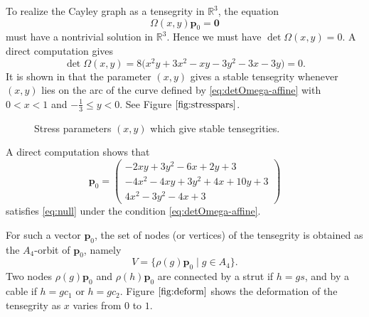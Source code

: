 \documentclass[12pt]{article}
\begin{document}
To realize the Cayley graph as a tensegrity in $\mathbb{R}^3$,
the equation
\begin{equation}
 \label{eq:null}
 \Omega(x,y)\mathbf{p}_0=\mathbf{0}
\end{equation}
must have a nontrivial solution in $\mathbb{R}^3$.
Hence we must have $\det\Omega(x,y)=0$.
A direct computation gives
\begin{equation}
 \label{eq:detOmega-affine}
 \det \Omega(x,y)
 = 8\bigl(x^2y + 3x^2 - xy - 3y^2 - 3x - 3y\bigr)=0.
\end{equation}
It is shown in \cite{connelly2022frameworks} that the parameter $(x,y)$
gives a stable tensegrity whenever $(x,y)$ lies on the arc of the curve
defined by \eqref{eq:detOmega-affine} with $0<x<1$ and $-\frac{1}{3}\le y<0$.
See Figure $\ref{fig:stresspars}$.
\begin{center}
 \begin{figure}[H]
  \begin{center}
   \caption{Stress parameters $(x,y)$ which give stable tensegrities.}
   \label{fig:stresspars}
  \end{center}
 \end{figure}
\end{center}



A direct computation shows that
\[
\mathbf{p}_0=
\begin{pmatrix}
 -2xy + 3y^2 - 6x + 2y + 3\\
 -4x^2 - 4xy + 3y^2 + 4x + 10y + 3\\
 4x^2 - 3y^2 - 4x + 3
\end{pmatrix}
\]
satisfies \eqref{eq:null} under the condition \eqref{eq:detOmega-affine}.

For such a vector $\mathbf{p}_0$, the set of nodes (or vertices) of the tensegrity
is obtained as the $A_4$-orbit of $\mathbf{p}_0$, namely
\[
 V=\{\rho(g)\mathbf{p}_0 \mid g\in A_4\}.
\]
Two nodes $\rho(g)\mathbf{p}_0$ and $\rho(h)\mathbf{p}_0$
are connected by a strut if $h=gs$,
and by a cable if $h=gc_1$ or $h=gc_2$.
Figure $\ref{fig:deform}$ shows the
deformation of the tensegrity as $x$ varies from $0$ to $1$.
\end{document}
